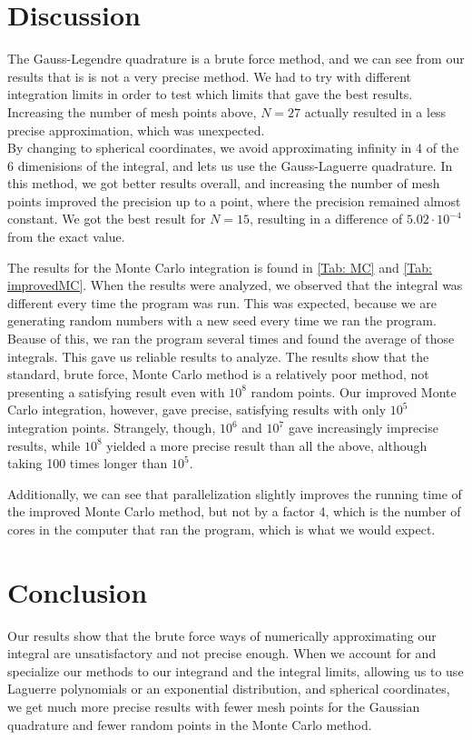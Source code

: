 \documentclass{article}
\begin{document}
\section*{Discussion}
	The Gauss-Legendre quadrature is a brute force method, and we can see from our results that is is not a very precise method. We had to try with different integration limits in order to test which limits that gave the best results. Increasing the number of mesh points above, $N = 27$ actually resulted in a less precise approximation, which was unexpected.\\

	By changing to spherical coordinates, we avoid approximating infinity in 4 of the 6 dimenisions of the integral, and lets us use the Gauss-Laguerre quadrature. In this method, we got better results overall, and increasing the number of mesh points improved the precision up to a point, where the precision remained almost constant. We got the best result for $N=15$, resulting in a difference of $5.02\cdot10^{-4}$ from the exact value.

	The results for the Monte Carlo integration is found in \ref{Tab: MC} and \ref{Tab: improvedMC}. When the results were analyzed, we observed that the integral was different every time the program was run. This was expected, because we are generating random numbers with a new seed every time we ran the program. Beause of this, we ran the program several times and found the average of those integrals. This gave us reliable results to analyze.
	The results show that the standard, brute force, Monte Carlo method is a relatively poor method, not presenting a satisfying result even with $10^8$ random points. Our improved Monte Carlo integration, however, gave precise, satisfying results with only $10^5$ integration points. Strangely, though, $10^6$ and $10^7$ gave increasingly imprecise results, while $10^8$ yielded a more precise result than all the above, although taking 100 times longer than $10^5$.

	Additionally, we can see that parallelization slightly improves the running time of the improved Monte Carlo method, but not by a factor 4, which is the number of cores in the computer that ran the program, which is what we would expect. 

\section*{Conclusion}
	Our results show that the brute force ways of numerically approximating our integral are unsatisfactory and not precise enough. When we account for and specialize our methods to our integrand and the integral limits, allowing us to use Laguerre polynomials or an exponential distribution, and spherical coordinates, we get much more precise results with fewer mesh points for the Gaussian quadrature and fewer random points in the Monte Carlo method.
\end{document}

